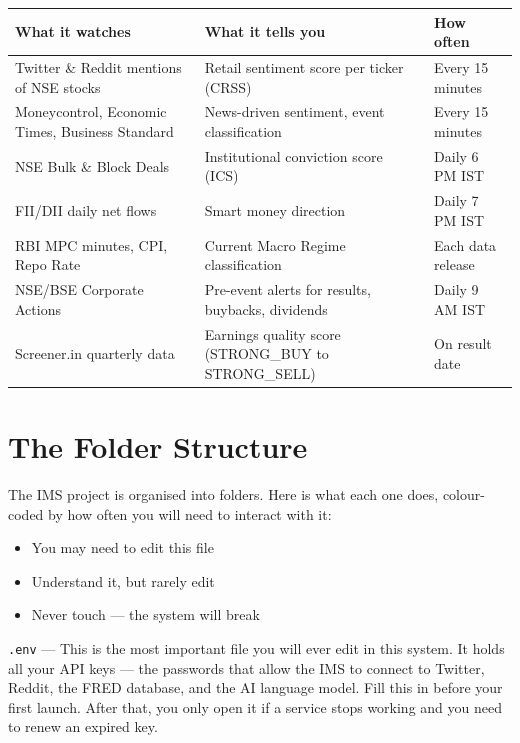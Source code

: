 \documentclass[12pt, a4paper]{report}
\begin{document}
\begin{longtable}{p{4.5cm} p{5.5cm} p{3.5cm}}
\toprule
\textbf{What it watches} & \textbf{What it tells you} & \textbf{How often} \\
\midrule
Twitter \& Reddit mentions of NSE stocks & Retail sentiment score per ticker (CRSS) & Every 15 minutes \\
Moneycontrol, Economic Times, Business Standard & News-driven sentiment, event classification & Every 15 minutes \\
NSE Bulk \& Block Deals & Institutional conviction score (ICS) & Daily 6 PM IST \\
FII/DII daily net flows & Smart money direction & Daily 7 PM IST \\
RBI MPC minutes, CPI, Repo Rate & Current Macro Regime classification & Each data release \\
NSE/BSE Corporate Actions & Pre-event alerts for results, buybacks, dividends & Daily 9 AM IST \\
Screener.in quarterly data & Earnings quality score (STRONG\_BUY to STRONG\_SELL) & On result date \\
\bottomrule
\end{longtable}

\chapter{The Folder Structure}

The IMS project is organised into folders. Here is what each one does, colour-coded by how often you will need to interact with it:

\begin{itemize}[leftmargin=2cm]
\item[\textcolor{imsEmerald}{\textbf{GREEN}}] You may need to edit this file
\item[\textcolor{imsAmber}{\textbf{YELLOW}}] Understand it, but rarely edit
\item[\textcolor{imsCrimson}{\textbf{RED}}] Never touch --- the system will break
\end{itemize}

\textcolor{imsEmerald}{\texttt{.env}} --- This is the most important file you will ever edit in this system. It holds all your API keys --- the passwords that allow the IMS to connect to Twitter, Reddit, the FRED database, and the AI language model. Fill this in before your first launch. After that, you only open it if a service stops working and you need to renew an expired key.
\end{document}
